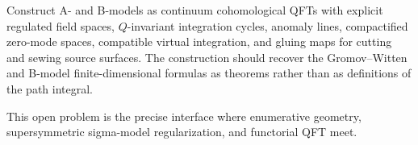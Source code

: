 \begin{openproblem}
\label{op:topological-sigma-model-continuum-qft}
Construct A- and B-models as continuum cohomological QFTs with explicit
regulated field spaces, \(Q\)-invariant integration cycles, anomaly lines,
compactified zero-mode spaces, compatible virtual integration, and gluing
maps for cutting and sewing source surfaces.  The construction should recover the
Gromov--Witten and B-model finite-dimensional formulas as theorems rather
than as definitions of the path integral.
\end{openproblem}

This open problem is the precise interface where enumerative geometry,
supersymmetric sigma-model regularization, and functorial QFT meet.
